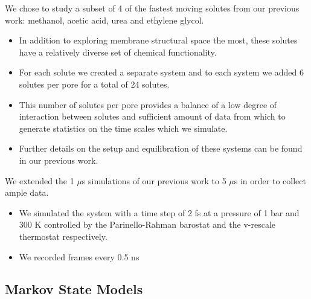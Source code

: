 \documentclass{article}
\begin{document}
  We chose to study a subset of 4 of the fastest moving solutes from our previous
  work: methanol, acetic acid, urea and ethylene glycol.
  \begin{itemize} 
    \item In addition to exploring membrane structural space the most, these solutes
    have a relatively diverse set of chemical functionality.   
    \item For each solute we created a separate system and to each system we
    added 6 solutes per pore for a total of 24 solutes.
    \item This number of solutes per pore provides a balance of a low 
    degree of interaction between solutes and sufficient amount of data from
    which to generate statistics on the time scales which we simulate.
    \item Further details on the setup and equilibration of these systems can
    be found in our previous work.\cite{coscia_chemically_2019}
  \end{itemize}
  
  \noindent We extended the 1 $\mu$s simulations of our previous work to 5 $\mu$s in order
  to collect ample data.
  \begin{itemize}
    \item We simulated the system with a time step of 2 fs at a pressure of 1 bar
    and 300 K controlled by the Parinello-Rahman barostat and the v-rescale thermostat
    respectively.
    \item We recorded frames every 0.5 ns
  \end{itemize}
  
  \subsection{Markov State Models}\label{method:MSMs}  %
  
\end{document}

